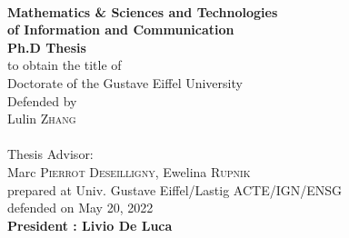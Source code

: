 \begin{titlepage}
\begin{center}
	
\vspace*{0.3cm}
 \\
\noindent \textbf{Mathematics \& Sciences and Technologies\\of Information and Communication} \\
\vspace*{0.5cm}
\noindent \Huge \textbf{Ph.D Thesis} \\
\vspace*{0.3cm}
\noindent \large {to obtain the title of} \\
\vspace*{0.3cm}
\noindent \Large Doctorate of the Gustave Eiffel University \\
\vspace*{0.4cm}
\noindent \large {Defended by\\}
\noindent \huge Lulin \textsc{Zhang} \\
\vspace*{0.8cm}
 \\
\vspace*{0.8cm}
\noindent \Large Thesis Advisor: \\
Marc \textsc{Pierrot Deseilligny}, Ewelina \textsc{Rupnik}\\
\vspace*{0.2cm}
\noindent \Large prepared at Univ. Gustave Eiffel/Lastig ACTE/IGN/ENSG\\
\vspace*{0.2cm}
\noindent \large defended on May 20, 2022 \\
\vspace*{0.5cm}
\noindent \large \textbf{President : Livio De Luca} \\
\end{center}


\end{titlepage}
